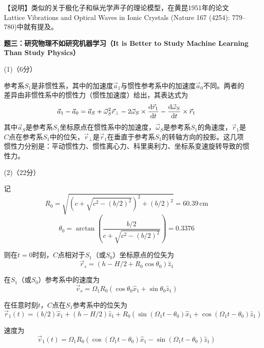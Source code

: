 \documentclass[10pt,a4paper,onecolumn,UTF8]{ctexart}
\begin{document}
	【说明】类似的关于极化子和纵光学声子的理论模型，在黄昆1951年的论文Lattice Vibrations and Optical Waves in Ionic Crystals (Nature 167 (4254): 779–780)中就有提及。
	
	
	
	\setcounter{equation}{0}
	\newpage

	\noindent
	\textbf{题三：研究物理不如研究机器学习（It is Better to Study Machine Learning Than Study Physics）}
	
	(1)（6分）
	
	参考系$S_1$是非惯性系，其中的加速度$\vec a_1$与惯性参考系中的加速度$\vec a_0$不同。两者的差异由非惯性系中的惯性力（惯性加速度）给出，其表达式为
	\begin{equation}\label{E3-01}
		\vec a_1-\vec a_0=\vec a_S+\vec\omega_S^2\vec r_{\perp}-2\vec\omega_S\times\frac{\mathrm{d} \vec r_1}{\mathrm{d} t}-\frac{\mathrm{d} \vec\omega_S}{\mathrm{d} t}\times\vec r_1
	\end{equation}
	其中$\vec a_S$是参考系$S_1$坐标原点在惯性系中的加速度，$\vec\omega_S$是参考系$S_1$的角速度，$\vec r_1$是$C$点在参考系$S_1$中的位矢，$\vec r_{\perp}$是$\vec r_1$在垂直于参考系$S_1$的转轴方向的投影。这几项惯性力分别是：平动惯性力、惯性离心力、科里奥利力、坐标系变速旋转导致的惯性力。
	
	(2)（22分）
	
	记
	$$R_0=\sqrt{\left(c+\sqrt{c^2-\left(b/2\right)^2}\right)^2+(b/2)^2}=60.39\,\text{cm}$$
	$$\theta_0=\arctan\left(\frac{b/2}{c+\sqrt{c^2-\left(b/2\right)^2}}\right)=0.3376$$
	
	则在$t=0$时刻，$C$点相对于$S_1$（或$S_0$）坐标原点的位矢为
	\begin{equation}\label{E3-02}
		\vec r_s=\left(h-H/2+R_0\cos\theta_0\right)\hat z_1
	\end{equation}
	
	在$S_1$（或$S_0$）参考系中的速度为
	\begin{equation}\label{E3-03}
		\vec v_s=\Omega_1R_0\left(\cos\theta_0\hat x_1+\sin\theta_0\hat z_1\right)
	\end{equation}	
	
	在任意时刻$t$，$C$点在$S_1$参考系中的位矢为
	\begin{equation}\label{E3-04}
		\vec r_1(t)=(b/2)\hat x_1+(h-H/2)\hat z_1+R_0\left(\sin(\Omega_1t-\theta_0)\hat x_1+\cos(\Omega_1t-\theta_0)\hat z_1\right)
	\end{equation}
	
	速度为
	\begin{equation}
		\vec v_1(t)=\Omega_1R_0\left(\cos(\Omega_1t-\theta_0)\hat x_1-\sin(\Omega_1t-\theta_0)\hat z_1\right)
	\end{equation}
	
\end{document}
